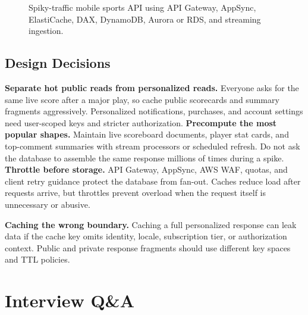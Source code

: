 \begin{figure}[H]
{%
    }
    \caption{Spiky-traffic mobile sports API using API Gateway, AppSync, ElastiCache, DAX, DynamoDB, Aurora or RDS, and streaming ingestion.}
    \label{fig:ch4-spiky-mobile-api}
\end{figure}
\subsection{Design Decisions}
\textbf{Separate hot public reads from personalized reads.} Everyone asks for the same live score after a major play, so cache public scorecards and summary fragments aggressively. Personalized notifications, purchases, and account settings need user-scoped keys and stricter authorization.
\textbf{Precompute the most popular shapes.} Maintain live scoreboard documents, player stat cards, and top-comment summaries with stream processors or scheduled refresh. Do not ask the database to assemble the same response millions of times during a spike.
\textbf{Throttle before storage.} API Gateway, AppSync, AWS WAF, quotas, and client retry guidance protect the database from fan-out. Caches reduce load after requests arrive, but throttles prevent overload when the request itself is unnecessary or abusive.
\begin{pitfall}
\textbf{Caching the wrong boundary.} Caching a full personalized response can leak data if the cache key omits identity, locale, subscription tier, or authorization context. Public and private response fragments should use different key spaces and TTL policies.
\end{pitfall}
\section{Interview Q\&A}
